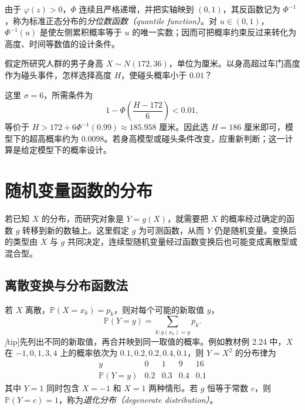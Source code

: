 由于 $\varphi(z)>0$，$\Phi$ 连续且严格递增，并把实轴映到 $(0,1)$，其反函数记为 $\Phi^{-1}$，称为标准正态分布的\emph{分位数函数（quantile function）}。对 $u\in(0,1)$，$\Phi^{-1}(u)$ 是使左侧累积概率等于 $u$ 的唯一实数；因而可把概率约束反过来转化为高度、时间等数值的设计条件。

\begin{example}
\label{ex:study-normal-door}
假定所研究人群的男子身高 $X\sim N(172,36)$，单位为厘米。以身高超过车门高度作为碰头事件，怎样选择高度 $H$，使碰头概率小于 $0.01$？
\end{example}

\begin{solve}
这里 $\sigma=6$，所需条件为
\[
  1-\Phi\left(\frac{H-172}{6}\right)<0.01,
\]
等价于 $H>172+6\Phi^{-1}(0.99)\approx185.958$ 厘米。因此选 $H=186$ 厘米即可，模型下的超高概率约为 $0.0098$。若身高模型或碰头条件改变，应重新判断；这一计算是给定模型下的概率设计。
\end{solve}

\section{随机变量函数的分布}
\label{sec:study-transformed-distributions}

若已知 $X$ 的分布，而研究对象是 $Y=g(X)$，就需要把 $X$ 的概率经过确定的函数 $g$ 转移到新的数轴上。这里假定 $g$ 为可测函数，从而 $Y$ 仍是随机变量。变换后的类型由 $X$ 与 $g$ 共同决定，连续型随机变量经过函数变换后也可能变成离散型或混合型。

\subsection{离散变换与分布函数法}
\label{subsec:study-transformation-cdf}

若 $X$ 离散，$\mathbb P(X=x_k)=p_k$，则对每个可能的新取值 $y$，
\begin{equation}
  \mathbb P(Y=y)=\sum_{k:g(x_k)=y}p_k.
  \label{eq:study-discrete-transformation}
\end{equation}
\emph[tip]{先列出不同的新取值，再合并映到同一取值的概率。}例如教材例 2.24 中，$X$ 在 $-1,0,1,3,4$ 上的概率依次为 $0.1,0.2,0.2,0.4,0.1$，则 $Y=X^2$ 的分布律为
\[
  \begin{array}{c|cccc}
    y&0&1&9&16\\\hline
    \mathbb P(Y=y)&0.2&0.3&0.4&0.1
  \end{array}
\]
其中 $Y=1$ 同时包含 $X=-1$ 和 $X=1$ 两种情形。若 $g$ 恒等于常数 $c$，则 $\mathbb P(Y=c)=1$，称为\emph{退化分布（degenerate distribution）}。

